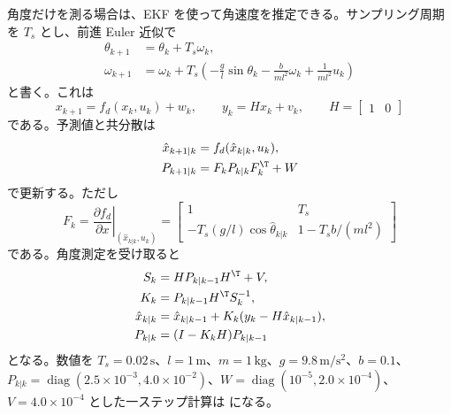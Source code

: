 角度だけを測る場合は、EKF を使って角速度を推定できる。サンプリング周期を $T_s$ とし、前進 Euler 近似で
\begin{align}
  \theta_{k+1}&=\theta_k+T_s\omega_k,\\
  \omega_{k+1}&=
  \omega_k+T_s
  \left(
    -\frac{g}{l}\sin\theta_k
    -\frac{b}{ml^2}\omega_k
    +\frac{1}{ml^2}u_k
  \right)
\end{align}
と書く。これは
\begin{equation}
  x_{k+1}=f_d(x_k,u_k)+w_k,
  \qquad
  y_k=Hx_k+v_k,\qquad H=\begin{bmatrix}1&0\end{bmatrix}
\end{equation}
である。予測値と共分散は
\begin{align}
  \hat{x}_{k+1|k}&=f_d(\hat{x}_{k|k},u_k),\\
  P_{k+1|k}&=F_kP_{k|k}F_k^\T+W
\end{align}
で更新する。ただし
\begin{equation}
  F_k=
  \left.
  \frac{\partial f_d}{\partial x}
  \right|_{(\hat{x}_{k|k},u_k)}
  =
  \begin{bmatrix}
    1&T_s\\
    -T_s(g/l)\cos\hat{\theta}_{k|k}&1-T_sb/(ml^2)
  \end{bmatrix}
\end{equation}
である。角度測定を受け取ると
\begin{align}
  S_k&=HP_{k|k-1}H^\T+V,\\
  K_k&=P_{k|k-1}H^\T S_k^{-1},\\
  \hat{x}_{k|k}&=\hat{x}_{k|k-1}+K_k(y_k-H\hat{x}_{k|k-1}),\\
  P_{k|k}&=(I-K_kH)P_{k|k-1}
\end{align}
となる。数値を $T_s=0.02\,\mathrm{s}$、$l=1\,\mathrm{m}$、$m=1\,\mathrm{kg}$、$g=9.8\,\mathrm{m/s^2}$、$b=0.1$、$P_{k|k}=\operatorname{diag}(2.5\times10^{-3},4.0\times10^{-2})$、$W=\operatorname{diag}(10^{-5},2.0\times10^{-4})$、$V=4.0\times10^{-4}$ とした一ステップ計算は  になる。

